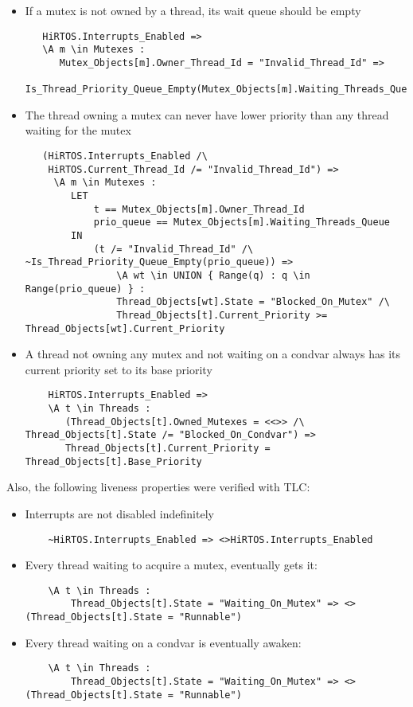 \documentclass[11pt,letterpaper,twoside,openany]{book}
\begin{document}
\begin{itemize}
\item If a mutex is not owned by a thread, its wait queue should be empty
\begin{lstlisting}
   HiRTOS.Interrupts_Enabled =>
   \A m \in Mutexes :
      Mutex_Objects[m].Owner_Thread_Id = "Invalid_Thread_Id" =>
        Is_Thread_Priority_Queue_Empty(Mutex_Objects[m].Waiting_Threads_Queue)
\end{lstlisting}

\item The thread owning a mutex can never have lower priority than any thread waiting
for the mutex
\begin{lstlisting}
   (HiRTOS.Interrupts_Enabled /\
    HiRTOS.Current_Thread_Id /= "Invalid_Thread_Id") =>
     \A m \in Mutexes :
        LET
            t == Mutex_Objects[m].Owner_Thread_Id
            prio_queue == Mutex_Objects[m].Waiting_Threads_Queue
        IN
            (t /= "Invalid_Thread_Id" /\ ~Is_Thread_Priority_Queue_Empty(prio_queue)) =>
                \A wt \in UNION { Range(q) : q \in Range(prio_queue) } :
                Thread_Objects[wt].State = "Blocked_On_Mutex" /\
                Thread_Objects[t].Current_Priority >= Thread_Objects[wt].Current_Priority
\end{lstlisting}

\item A thread not owning any mutex and not waiting on a condvar always has its current
priority set to its base priority
\begin{lstlisting}
    HiRTOS.Interrupts_Enabled =>
    \A t \in Threads :
       (Thread_Objects[t].Owned_Mutexes = <<>> /\ Thread_Objects[t].State /= "Blocked_On_Condvar") =>
       Thread_Objects[t].Current_Priority = Thread_Objects[t].Base_Priority
\end{lstlisting}
\end{itemize}

Also, the following liveness properties were verified with TLC:

\begin{itemize}
\item Interrupts are not disabled indefinitely
\begin{lstlisting}
    ~HiRTOS.Interrupts_Enabled => <>HiRTOS.Interrupts_Enabled
\end{lstlisting}

\item Every thread waiting to acquire a mutex, eventually gets it:
\begin{lstlisting}
    \A t \in Threads :
        Thread_Objects[t].State = "Waiting_On_Mutex" => <>(Thread_Objects[t].State = "Runnable")
\end{lstlisting}

\item Every thread waiting on a condvar is eventually awaken:
\begin{lstlisting}
    \A t \in Threads :
        Thread_Objects[t].State = "Waiting_On_Mutex" => <>(Thread_Objects[t].State = "Runnable")
\end{lstlisting}
\end{itemize}
\end{document}
